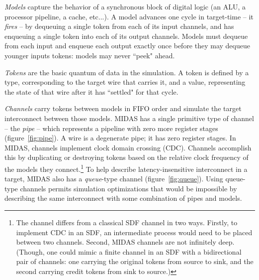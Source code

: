 \emph{Models} capture the behavior of a synchronous block of digital logic (an
ALU, a processor pipeline, a cache, etc...). A model advances one cycle in
target-time -- it \emph{fires} -- by dequeuing a single token from each of its
input channels, and has enqueuing a single token into each of its output
channels.  Models must dequeue from each input and enqueue each output
exactly once before they may dequeue younger inputs tokens: models may never
``peek" ahead.

\emph{Tokens} are the basic quantum of data in the simulation. A token is
defined by a type, corresponding to the target wire that carries it, and a
value, representing the state of that wire after it has ``settled" for that
cycle.

\emph{Channels} carry tokens between models in FIFO order and simulate the
target interconnect between those models. MIDAS has a single primitive type of
channel --  the \emph{pipe} -- which represents a pipeline with zero more
register stages (figure~\ref{fig:pipe}). A wire is a degenerate pipe; it has
zero register stages. In MIDAS, channels implement clock domain crossing (CDC).
Channels accomplish this by duplicating or destroying tokens based on the
relative clock frequency of the models they connect.\footnote{The channel
differs from a classical SDF channel in two ways.  Firstly, to implement CDC in
an SDF, an intermediate process would need to be placed between two channels.
Second, MIDAS channels are not infinitely deep.  (Though, one could mimic a
finite channel in an SDF with a bidirectional pair of channels: one carrying
the original tokens from source to sink, and the second carrying credit tokens
from sink to source.)} To help describe latency-insensitive interconnect in a
target, MIDAS also has a \emph{queue}-type channel (figure~\ref{fig:queue}).
Using queue-type channels permits simulation optimizations that would be
impossible by describing the same interconnect with some combination of pipes
and models.


